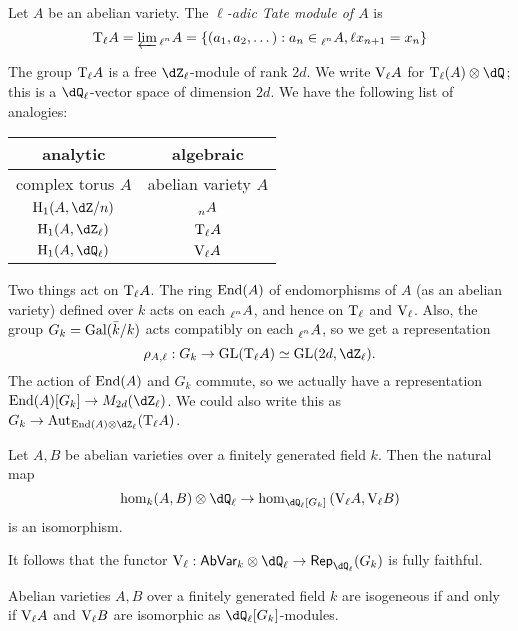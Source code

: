 \begin{definition}
Let $A$ be an abelian variety. The \emph{$\ell$-adic Tate module of $A$} is 
\[
  \mathrm{T}_\ell A = \varprojlim \prescript{}{\ell^n}{A} = \{(a_1,a_2,\dots) : a_n\in \prescript{}{\ell^n}{A},\ell x_{n+1}=x_n\}
\]
\end{definition}

The group $\mathrm{T}_\ell A$ is a free $\dZ_\ell$-module of rank $2 d$. We write 
$\mathrm{V}_\ell A$ for $\tate_\ell(A)\otimes\dQ$; this is a 
$\dQ_\ell$-vector space of dimension $2 d$. We have the following list of 
analogies: 
\begin{center}
\begin{tabular}{c|c}
analytic           & algebraic           \\ \hline 
complex torus $A$  & abelian variety $A$ \\
$\h_1(A,\dZ/n)$    & $\prescript{}{n}{A}$ \\
$\h_1(A,\dZ_\ell)$ & $\mathrm{T}_\ell A$ \\
$\h_1(A,\dQ_\ell)$ & $\mathrm{V}_\ell A$ 
\end{tabular}
\end{center}

Two things act on $\mathrm{T}_\ell A$. The ring $\operatorname{End}(A)$ of endomorphisms 
of $A$ (as an abelian variety) defined over $k$ acts on each $\prescript{}{\ell^n}{A}$, and 
hence on $\mathrm{T}_\ell$ and $\mathrm{V}_\ell$. Also, the group $G_k=\operatorname{Gal}(\bar k/k)$ acts 
compatibly on each $\prescript{}{\ell^n}{A}$, so we get a representation 
\[
  \rho_{A,\ell}:G_k\to \operatorname{GL}(\tate_\ell A)\simeq \gl{2 d}{\dZ_\ell} \text{.}
\]
The action of $\operatorname{End}(A)$ and $G_k$ commute, so we actually have a 
representation $\End(A)[G_k] \to M_{2 d}(\dZ_\ell)$. We could also write this 
as $G_k \to \aut_{\End(A)\otimes \dZ_\ell}(\tate_\ell A)$. 

\begin{theorem}[Faltings]
Let $A,B$ be abelian varieties over a finitely generated field $k$. Then 
the natural map 
\[
  \hom_k(A,B)\otimes\dQ_\ell \to \hom_{\dQ_\ell[G_k]}\left(\vtate_\ell A,\vtate_\ell B\right)
\]
is an isomorphism. 
\end{theorem}

It follows that the functor 
$\vtate_\ell:\mathsf{AbVar}_k\otimes\dQ_\ell\to \mathsf{Rep}_{\dQ_\ell}(G_k)$ is 
fully faithful. 

\begin{corollary}
Abelian varieties $A,B$ over a finitely generated field $k$ are isogeneous if 
and only if $\mathrm{V}_\ell A$ and $\mathrm{V}_\ell B$ are isomorphic as 
$\dQ_\ell[G_k]$-modules.
\end{corollary}

